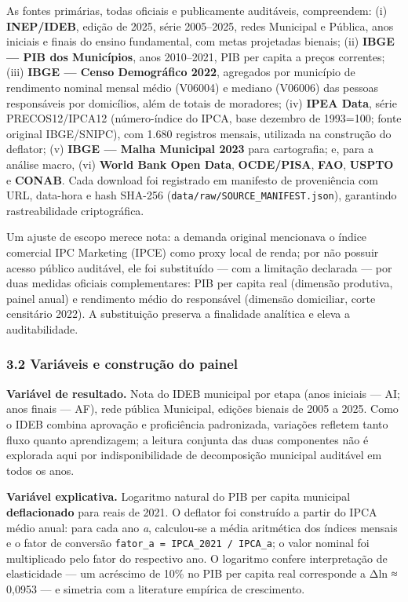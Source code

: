 \documentclass[
  brazilian,
  12pt,
  a4paper,
]{article}
\begin{document}
As fontes primárias, todas oficiais e publicamente auditáveis,
compreendem: (i) \textbf{INEP/IDEB}, edição de 2025, série 2005--2025,
redes Municipal e Pública, anos iniciais e finais do ensino fundamental,
com metas projetadas bienais; (ii) \textbf{IBGE --- PIB dos Municípios},
anos 2010--2021, PIB per capita a preços correntes; (iii) \textbf{IBGE
--- Censo Demográfico 2022}, agregados por município de rendimento
nominal mensal médio (V06004) e mediano (V06006) das pessoas
responsáveis por domicílios, além de totais de moradores; (iv)
\textbf{IPEA Data}, série PRECOS12/IPCA12 (número-índice do IPCA, base
dezembro de 1993=100; fonte original IBGE/SNIPC), com 1.680 registros
mensais, utilizada na construção do deflator; (v) \textbf{IBGE --- Malha
Municipal 2023} para cartografia; e, para a análise macro, (vi)
\textbf{World Bank Open Data}, \textbf{OCDE/PISA}, \textbf{FAO},
\textbf{USPTO} e \textbf{CONAB}. Cada download foi registrado em
manifesto de proveniência com URL, data-hora e hash SHA-256
(\texttt{data/raw/SOURCE\_MANIFEST.json}), garantindo rastreabilidade
criptográfica.

Um ajuste de escopo merece nota: a demanda original mencionava o índice
comercial IPC Marketing (IPCE) como proxy local de renda; por não
possuir acesso público auditável, ele foi substituído --- com a
limitação declarada --- por duas medidas oficiais complementares: PIB
per capita real (dimensão produtiva, painel anual) e rendimento médio do
responsável (dimensão domiciliar, corte censitário 2022). A substituição
preserva a finalidade analítica e eleva a auditabilidade.

\subsubsection{3.2 Variáveis e construção do
painel}\label{variuxe1veis-e-construuxe7uxe3o-do-painel}

\textbf{Variável de resultado.} Nota do IDEB municipal por etapa (anos
iniciais --- AI; anos finais --- AF), rede pública Municipal, edições
bienais de 2005 a 2025. Como o IDEB combina aprovação e proficiência
padronizada, variações refletem tanto fluxo quanto aprendizagem; a
leitura conjunta das duas componentes não é explorada aqui por
indisponibilidade de decomposição municipal auditável em todos os anos.

\textbf{Variável explicativa.} Logaritmo natural do PIB per capita
municipal \textbf{deflacionado} para reais de 2021. O deflator foi
construído a partir do IPCA médio anual: para cada ano \emph{a},
calculou-se a média aritmética dos índices mensais e o fator de
conversão \texttt{fator\_a~=~IPCA\_2021~/~IPCA\_a}; o valor nominal foi
multiplicado pelo fator do respectivo ano. O logaritmo confere
interpretação de elasticidade --- um acréscimo de 10\% no PIB per capita
real corresponde a Δln ≈ 0,0953 --- e simetria com a literature empírica
de crescimento.
\end{document}

